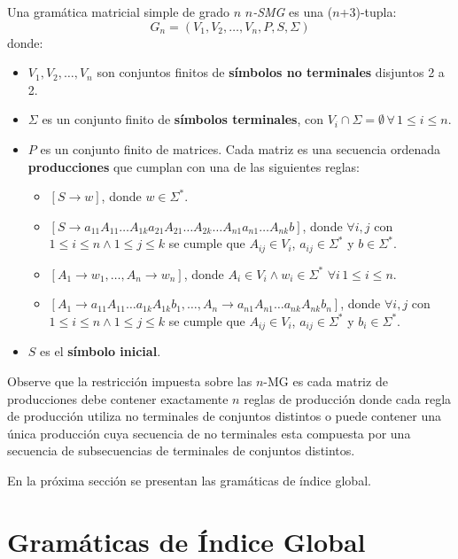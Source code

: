 \documentclass[12pt]{article}
\begin{document}
Una gramática matricial simple de grado $n$ \textit{$n$-SMG} es una ($n$+3)-tupla:
$$
    G_n=(V_1,V_2,\ldots,V_n,P,S,\Sigma)
$$
donde:
\begin{itemize}
    \item \( V_1, V_2, \ldots, V_n \) son conjuntos finitos de \textbf{símbolos no terminales} disjuntos 2 a 2.
    \item \( \Sigma \) es un conjunto finito de \textbf{símbolos terminales}, con \( V_i \cap \Sigma = \emptyset\,\forall\,1\leq i\leq n \).
    \item \( P \) es un conjunto finito de matrices. Cada matriz es una secuencia ordenada \textbf{producciones} que cumplan con una de las siguientes reglas:
          \begin{itemize}
              \item $[S\to w]$, donde $w\in \Sigma ^*$.
              \item $[S\to a_{11}A_{11}\ldots A_{1k}a_{21}A_{21}\ldots A_{2k}\ldots A_{n1}a_{n1}\ldots A_{nk}b]$,
                    donde $\forall i,j$ con $1\leq i\leq n\wedge 1\leq j\leq k$ se cumple que
                    $A_{ij}\in V_i$, $a_{ij}\in \Sigma ^*$ y $b\in \Sigma ^*$.
              \item $[A_1\to w_1,\ldots, A_n\to w_n]$, donde $A_i\in V_i\wedge w_i\in \Sigma ^*$ $\forall i\, 1\leq i\leq n$.
              \item $[A_1 \to a_{11}A_{11}\ldots a_{1k}A_{1k}b_1,\ldots,A_n \to a_{n1}A_{n1}\ldots a_{nk}A_{nk}b_n]$, donde $\forall i,j$
                    con $1\leq i\leq n\wedge 1\leq j\leq k$ se cumple que
                    $A_{ij}\in V_i$, $a_{ij}\in \Sigma ^*$ y $b_{i}\in \Sigma ^*$.
          \end{itemize}
    \item \( S \) es el \textbf{símbolo inicial}.
\end{itemize}


Observe que la restricción impuesta sobre las $n$-MG es cada matriz de producciones debe contener exactamente $n$ reglas de producción
donde cada regla de producción utiliza no terminales de conjuntos distintos o puede contener una única producción cuya secuencia de no terminales
esta compuesta por una secuencia de subsecuencias de terminales de conjuntos distintos.

En la próxima sección se presentan las gramáticas de índice global.
\section{Gramáticas de Índice Global}
\end{document}

